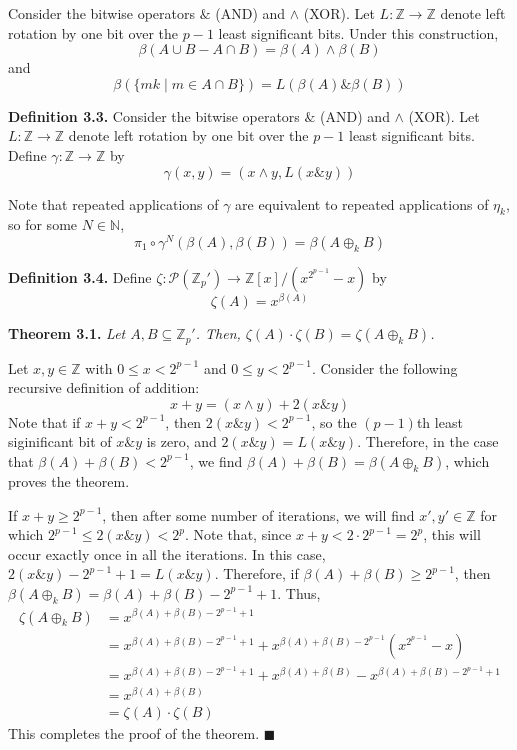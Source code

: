 \documentclass{article}
\newcommand{\zee}{\mathbb{Z}}
\newcommand{\N}{\mathbb{N}}
\begin{document}
Consider the bitwise operators $\&$ (AND) and $\wedge$ (XOR).
Let $L: \zee \rightarrow \zee$ denote left rotation by one bit
over the $p-1$ least significant bits.
Under this construction,
\[\beta(A \cup B - A \cap B) = \beta(A) \wedge \beta(B)\]
and
\[\beta(\{mk \mid m \in A \cap B\}) = L(\beta(A) \mathbin{\&} \beta(B))\]

\textbf{Definition 3.3.} Consider the bitwise operators $\&$ (AND)
and $\wedge$ (XOR).
Let $L: \zee \rightarrow \zee$ denote left rotation by one bit
over the $p-1$ least significant bits.
Define $\gamma: \zee \rightarrow \zee$
by
\[\gamma(x, y) = (x \wedge y, L(x \mathbin{\&} y))\]

Note that repeated applications of $\gamma$ are equivalent to
repeated applications of $\eta_k$, so for some $N \in \N$,
\[\pi_1 \circ \gamma^N(\beta(A), \beta(B)) = \beta(A \oplus_k B)\]

\textbf{Definition 3.4.} Define $\zeta: \mathcal{P}(\zee_p')
\rightarrow \zee[x]/(x^{2^{p-1}}-x)$ by
\[\zeta(A) = x^{\beta(A)}\]

\textbf{Theorem 3.1.} \textit{Let $A, B \subseteq \zee_p'$.
Then, $\zeta(A) \cdot \zeta(B) = \zeta(A \oplus_k B)$.}

Let $x, y \in \zee$ with $0 \leq x < 2^{p-1}$
and $0 \leq y < 2^{p-1}$.
Consider the following recursive definition of addition:
\[x + y = (x \wedge y) + 2(x \mathbin{\&} y)\]
Note that if $x + y < 2^{p-1}$, then
$2(x \mathbin{\&} y) < 2^{p-1}$, so the $(p-1)$th
least siginificant bit of $x \mathbin{\&} y$ is zero,
and $2(x \mathbin{\&} y) = L(x \mathbin{\&} y)$.
Therefore, in the case that $\beta(A) + \beta(B) < 2^{p-1}$,
we find
$\beta(A) + \beta(B) = \beta(A \oplus_k B)$,
which proves the theorem.

If $x + y \geq 2^{p-1}$, then after some number of iterations,
we will find $x', y' \in \zee$ for which
$2^{p-1} \leq 2(x \mathbin{\&} y) < 2^p$.
Note that, since $x + y < 2 \cdot 2^{p-1} = 2^p$, this will occur exactly
once in all the iterations. In this case,
$2(x \mathbin{\&} y) - 2^{p-1} + 1 = L(x \mathbin{\&} y)$.
Therefore, if $\beta(A) + \beta(B) \geq 2^{p-1}$, then
$\beta(A \oplus_k B) = \beta(A) + \beta(B) - 2^{p-1} + 1$.
Thus,
\[\begin{split}
    \zeta(A \oplus_k B) &= x^{\beta(A) + \beta(B) - 2^{p-1} + 1} \\
    &= x^{\beta(A) + \beta(B) - 2^{p-1} + 1} +
        x^{\beta(A) + \beta(B) - 2^{p-1}}(x^{2^{p-1}} - x) \\
    &= x^{\beta(A) + \beta(B) - 2^{p-1} + 1} +
        x^{\beta(A) + \beta(B)} - x^{\beta(A) + \beta(B) - 2^{p-1} + 1} \\
    &= x^{\beta(A) + \beta(B)} \\
    &= \zeta(A) \cdot \zeta(B)
\end{split}\]
This completes the proof of the theorem. $\blacksquare$
\end{document}
